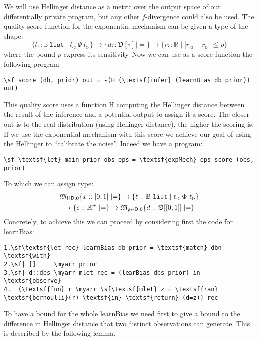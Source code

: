 \documentclass{sig-alternate-05-2015}
\theoremstyle{plain}
\theoremstyle{definition}
\theoremstyle{corollary}
\def\reals{\ensuremath{\mathbb{R}}\xspace}
\def\kwlist{\mathtt{list}}
\newcommand{\stbool}[0]{\mathbb{B}}
\newcommand{\stlist}[1]{{#1}\ \kwlist}
\def\lvmark{\triangleleft}
\def\rvmark{\triangleright}
\renewcommand{\l}[1]{#1_\lvmark}
\renewcommand{\r}[1]{#1_\rvmark}
\def\R{\mathbb{R}}
\newcommand{\rplus}{\R^+}
\newcommand{\fdiv}{\ensuremath{f}}
\begin{document}
We will use Hellinger distance as a metric over the output space of our
differentially private program, but any other \fdiv-divergence could
also be used.
The quality score function for the exponential mechanism can be given a
type of the shape:
$$
\{l:: \stlist{\stbool}\mid \l{l}\ \Phi\ \r{l} \}
\rightarrow\{d:: \mathfrak{D}[\tau] \mid = \}
\rightarrow\{r::\reals \mid |\l{r}-\r{r}|\leq \rho\}
$$
where the bound $\rho$ express its sensitivity. Now we can use as a
score function the following program
\begin{Verbatim}[commandchars=\\\{\}]
\sf score (db, prior) out = -(H (\textsf{infer} (learnBias db prior)) out)
\end{Verbatim}
This quality score uses a function {\sf H} computing the Hellinger
distance between the result of the inference and a potential output to
assign it a score.
The closer {\sf out}  is to
the real distribution (using Hellinger distance), the higher
the scoring is. If we use the exponential mechanism with this
score we achieve our goal of using the Hellinger to ``calibrate
the noise''. Indeed we have a program:
\begin{Verbatim}[commandchars=\\\{\}]
\sf \textsf{let} main prior obs eps = \textsf{expMech} eps score (obs, prior)
\end{Verbatim}
To which we can assign type:
\begin{multline*} 
\mathfrak{M}_{\mathsf{HD},0}\{x:: [0,1] \mid =
 \}\rightarrow\{\ell::\stlist{\stbool} \mid \l{\ell}\ \Phi\
 \r{\ell}\}\\ \rightarrow\{\epsilon:: \rplus \mid = \}\rightarrow
\mathfrak{M}_{\rho\epsilon\textnormal{-}\mathsf{D},0}\{ d::\mathfrak{D}
 [[0,1]]  \mid = \}
\end{multline*}
Concretely, to achieve this we can proceed by considering first the code for \textsf{learnBias}:
\begin{Verbatim}[commandchars=\\\{\}]
1.\sf\textsf{let rec} learnBias db prior = \textsf{match} dbn \textsf{with}
2.\sf| []     \myarr prior
3.\sf| d::dbs \myarr mlet rec = (learBias dbs prior) in \textsf{observe}
4.  (\textsf{fun} r \myarr \sf\textsf{mlet} z = \textsf{ran} \textsf{bernoulli}(r) \textsf{in} \textsf{return} (d=z)) rec
\end{Verbatim}
To have a bound for the whole {\sf learnBias} we need first to give a
bound to the difference in Hellinger distance that two distinct observations can
generate. This is described by the following lemma.
\end{document}
